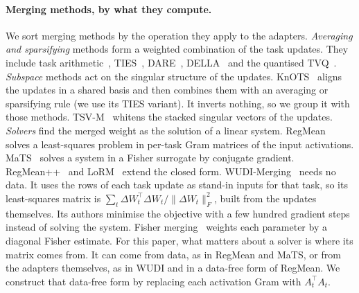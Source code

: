 \paragraph{Merging methods, by what they compute.} We sort merging methods by
the operation they apply to the adapters. \emph{Averaging and
sparsifying} methods form a weighted combination of the task updates. They
include task arithmetic~\citep{ilharco2023task}, TIES~\citep{yadav2023ties},
DARE~\citep{yu2024dare}, DELLA~\citep{della2024} and the quantised
TVQ~\citep{kim2025tvq}. \emph{Subspace} methods act on the singular structure
of the updates. KnOTS~\citep{stoica2025knots} aligns the updates in a shared
basis and then combines them with an averaging or sparsifying rule (we use its
TIES variant). It inverts nothing, so we group it with those methods.
TSV-M~\citep{gargiulo2025tsv} whitens the stacked singular vectors of the
updates. \emph{Solvers} find the merged weight as the solution of a linear
system. RegMean~\citep{jin2023regmean} solves a least-squares problem in
per-task Gram matrices of the input activations. MaTS~\citep{tam2024mats}
solves a system in a Fisher surrogate by conjugate gradient.
RegMean++~\citep{regmeanpp2025} and LoRM~\citep{lorm2024} extend the closed
form. WUDI-Merging~\citep{cheng2025wudi} needs no data. It uses the rows of
each task update as stand-in inputs for that task, so its least-squares
matrix is $\sum_t \Delta W_t^\top \Delta W_t / \|\Delta W_t\|_F^2$, built from
the updates themselves. Its authors minimise the objective with a few hundred
gradient steps instead of solving the system. Fisher
merging~\citep{matena2022fisher} weights each parameter by a diagonal Fisher
estimate. For this paper, what matters about a solver is where its matrix
comes from. It can come from data, as in RegMean and MaTS, or from the
adapters themselves, as in WUDI and in a data-free form of RegMean. We
construct that data-free form by replacing each activation Gram with
$A_t^\top A_t$.

